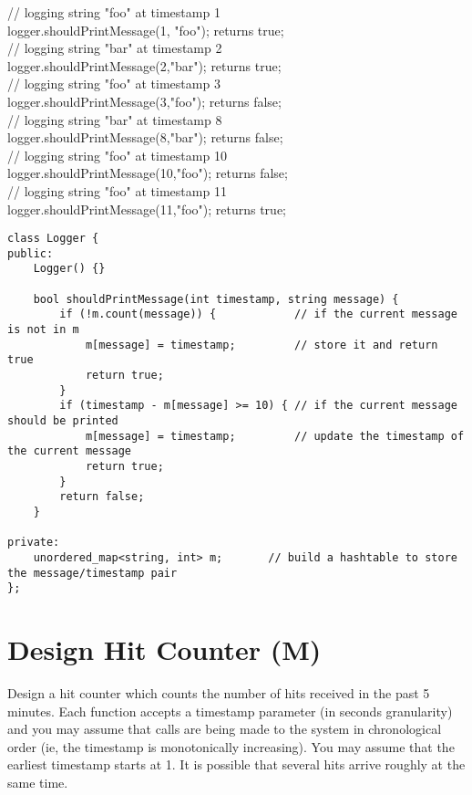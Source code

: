 // logging string "foo" at timestamp 1\\
logger.shouldPrintMessage(1, "foo"); returns true;\\

// logging string "bar" at timestamp 2\\
logger.shouldPrintMessage(2,"bar"); returns true;\\

// logging string "foo" at timestamp 3\\
logger.shouldPrintMessage(3,"foo"); returns false;\\

// logging string "bar" at timestamp 8\\
logger.shouldPrintMessage(8,"bar"); returns false;\\

// logging string "foo" at timestamp 10\\
logger.shouldPrintMessage(10,"foo"); returns false;\\

// logging string "foo" at timestamp 11\\
logger.shouldPrintMessage(11,"foo"); returns true;\\

\begin{lstlisting}
class Logger {
public:
    Logger() {}
    
    bool shouldPrintMessage(int timestamp, string message) {
        if (!m.count(message)) {            // if the current message is not in m
            m[message] = timestamp;         // store it and return true
            return true;
        } 
        if (timestamp - m[message] >= 10) { // if the current message should be printed
            m[message] = timestamp;         // update the timestamp of the current message
            return true;
        }
        return false;
    }

private:
    unordered_map<string, int> m;       // build a hashtable to store the message/timestamp pair
};
\end{lstlisting}


\section{Design Hit Counter (M)}
Design a hit counter which counts the number of hits received in the past 5 minutes. Each function accepts a timestamp parameter (in seconds granularity) and you may assume that calls are being made to the system in chronological order (ie, the timestamp is monotonically increasing). You may assume that the earliest timestamp starts at 1. It is possible that several hits arrive roughly at the same time.\\

